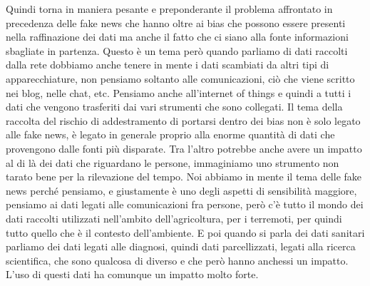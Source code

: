Quindi torna in maniera pesante e preponderante il problema affrontato in precedenza delle fake news che hanno oltre ai bias che possono essere presenti nella raffinazione dei dati ma anche il fatto che ci siano alla fonte informazioni sbagliate in partenza.
Questo è un tema però quando parliamo di dati raccolti dalla rete dobbiamo anche tenere in mente i dati scambiati da altri tipi di apparecchiature, non pensiamo soltanto alle comunicazioni, ciò che viene scritto nei blog, nelle chat, etc.
Pensiamo anche all'internet of things e quindi a tutti i dati che vengono trasferiti dai vari strumenti che sono collegati.
Il tema della raccolta del rischio di addestramento di portarsi dentro dei bias non è solo legato alle fake news, è legato in generale proprio alla enorme quantità di dati che provengono dalle fonti più disparate.
Tra l'altro potrebbe anche avere un impatto al di là dei dati che riguardano le persone, immaginiamo uno strumento non tarato bene per la rilevazione del tempo.
Noi abbiamo in mente il tema delle fake news perché pensiamo, e giustamente è uno degli aspetti di sensibilità maggiore, pensiamo ai dati legati alle comunicazioni fra persone, però c'è tutto il mondo dei dati raccolti utilizzati nell'ambito dell'agricoltura, per i terremoti, per quindi tutto quello che è il contesto dell'ambiente.
E poi quando si parla dei dati sanitari parliamo dei dati legati alle diagnosi, quindi dati parcellizzati, legati alla ricerca scientifica, che sono qualcosa di diverso e che però hanno anchessi un impatto.
L'uso di questi dati ha comunque un impatto molto forte.